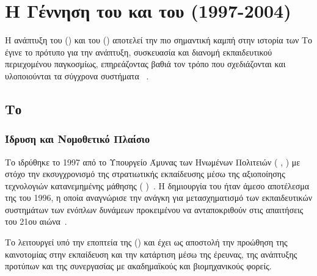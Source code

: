 \section{Η Γέννηση του  και του  (1997-2004)}
\label{sec:adl_scorm_birth}

Η ανάπτυξη του \textit{  } ()  και του \textit{    } () αποτελεί την πιο σημαντική καμπή στην ιστορία των   Το  έγινε το   πρότυπο για την ανάπτυξη, συσκευασία και διανομή εκπαιδευτικού περιεχομένου παγκοσμίως, επηρεάζοντας βαθιά τον τρόπο που σχεδιάζονται και υλοποιούνται τα σύγχρονα συστήματα ~\cite{adl2011scorm_guide,wiki_adl}.

\subsection{Το    }
\label{subsec:adl_initiative}

\subsubsection{Ίδρυση και Νομοθετικό Πλαίσιο}

Το   ιδρύθηκε το 1997 από το Υπουργείο Άμυνας των Ηνωμένων Πολιτειών (  , ) με στόχο την εκσυγχρονισμό της στρατιωτικής εκπαίδευσης μέσω της αξιοποίησης τεχνολογιών κατανεμημένης μάθησης (\textit{ })~\cite{dod1999strategic,dod2000implementation}. Η δημιουργία του  ήταν άμεσο αποτέλεσμα της \textit{  } του 1996, η οποία αναγνώρισε την ανάγκη για μετασχηματισμό των εκπαιδευτικών συστημάτων των ενόπλων δυνάμεων προκειμένου να ανταποκριθούν στις απαιτήσεις του 21ου αιώνα~\cite{teamorlando2023adl}.




Το  λειτουργεί υπό την εποπτεία της \textit{   } () και έχει ως αποστολή την προώθηση της καινοτομίας στην εκπαίδευση και την κατάρτιση μέσω της έρευνας, της ανάπτυξης προτύπων και της συνεργασίας με ακαδημαϊκούς και βιομηχανικούς φορείς.

